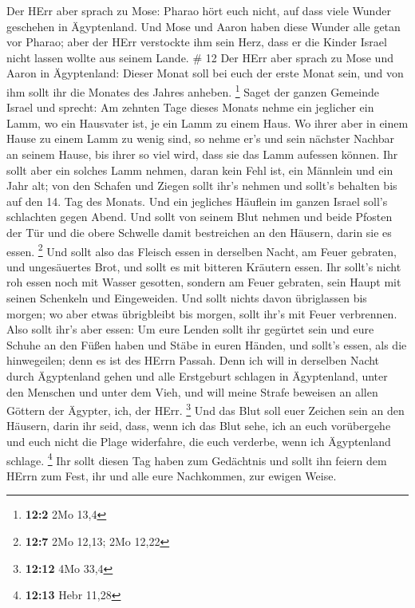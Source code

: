  Der HErr aber sprach zu Mose: Pharao hört euch nicht, auf
dass viele Wunder geschehen in Ägyptenland.  Und Mose und
Aaron haben diese Wunder alle getan vor Pharao; aber der HErr verstockte
ihm sein Herz, dass er die Kinder Israel nicht lassen wollte aus seinem
Lande. \# 12  Der HErr aber sprach zu Mose und Aaron in
Ägyptenland:  Dieser Monat soll bei euch der erste Monat
sein, und von ihm sollt ihr die Monates des Jahres anheben. \footnote{\textbf{12:2}
  2Mo 13,4}  Saget der ganzen Gemeinde Israel und sprecht:
Am zehnten Tage dieses Monats nehme ein jeglicher ein Lamm, wo ein
Hausvater ist, je ein Lamm zu einem Haus.  Wo ihrer aber in
einem Hause zu einem Lamm zu wenig sind, so nehme er's und sein nächster
Nachbar an seinem Hause, bis ihrer so viel wird, dass sie das Lamm
aufessen können.  Ihr sollt aber ein solches Lamm nehmen,
daran kein Fehl ist, ein Männlein und ein Jahr alt; von den Schafen und
Ziegen sollt ihr's nehmen  und sollt's behalten bis auf den
14. Tag des Monats. Und ein jegliches Häuflein im ganzen Israel soll's
schlachten gegen Abend.  Und sollt von seinem Blut nehmen
und beide Pfosten der Tür und die obere Schwelle damit bestreichen an
den Häusern, darin sie es essen. \footnote{\textbf{12:7} 2Mo 12,13; 2Mo
  12,22}  Und sollt also das Fleisch essen in derselben
Nacht, am Feuer gebraten, und ungesäuertes Brot, und sollt es mit
bitteren Kräutern essen.  Ihr sollt's nicht roh essen noch
mit Wasser gesotten, sondern am Feuer gebraten, sein Haupt mit seinen
Schenkeln und Eingeweiden.  Und sollt nichts davon
übriglassen bis morgen; wo aber etwas übrigbleibt bis morgen, sollt
ihr's mit Feuer verbrennen.  Also sollt ihr's aber essen:
Um eure Lenden sollt ihr gegürtet sein und eure Schuhe an den Füßen
haben und Stäbe in euren Händen, und sollt's essen, als die hinwegeilen;
denn es ist des HErrn Passah.  Denn ich will in derselben
Nacht durch Ägyptenland gehen und alle Erstgeburt schlagen in
Ägyptenland, unter den Menschen und unter dem Vieh, und will meine
Strafe beweisen an allen Göttern der Ägypter, ich, der HErr. \footnote{\textbf{12:12}
  4Mo 33,4}  Und das Blut soll euer Zeichen sein an den
Häusern, darin ihr seid, dass, wenn ich das Blut sehe, ich an euch
vorübergehe und euch nicht die Plage widerfahre, die euch verderbe, wenn
ich Ägyptenland schlage. \footnote{\textbf{12:13} Hebr 11,28}
 Ihr sollt diesen Tag haben zum Gedächtnis und sollt ihn
feiern dem HErrn zum Fest, ihr und alle eure Nachkommen, zur ewigen
Weise.

